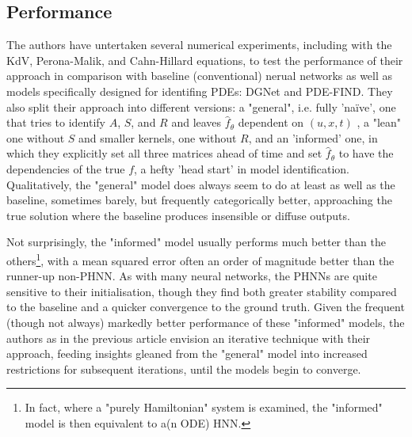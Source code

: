\documentclass[10 pt, a4paper]{article}
\begin{document}
\subsection{Performance}
The authors have untertaken several numerical experiments, including with the KdV, Perona-Malik, and Cahn-Hillard equations, to test the performance of their approach in comparison with baseline (conventional) nerual networks as well as models specifically designed for identifing PDEs: DGNet and PDE-FIND. They also split their approach into different versions: a "general", i.e. fully 'naïve', one that tries to identify $A$, $S$, and $R$ and leaves $\hat{f}_\theta$ dependent on $(u,x,t)$ , a "lean" one without $S$ and smaller kernels, one without $R$, and an 'informed' one, in which they explicitly set all three matrices ahead of time and set $\hat{f}_\theta$ to have the dependencies of the true $f$, a hefty 'head start' in model identification.\\
Qualitatively, the "general" model does always seem to do at least as well as the baseline, sometimes barely, but frequently categorically better, approaching the true solution where the baseline produces insensible or diffuse outputs. 
\begin{comment}
	Where they compare it to DGNet, the latter is more accurate, though the authors claim it "performs generally worse […] on varied test data" and is slower to train; PDE-FIND appears to do worse, but approach a qualitative resemblance to the true model, yet the authors simply state that it "is not able to find accurate models" in their experiments.
\end{comment}
Not surprisingly, the "informed" model usually performs much better than the others\footnote{In fact, where a "purely Hamiltonian" system is examined, the "informed" model is then equivalent to a(n ODE) HNN.}, with a mean squared error often an order of magnitude better than the runner-up non-PHNN. As with many neural networks, the PHNNs are quite sensitive to their initialisation, though they find both greater stability compared to the baseline and a quicker convergence to the ground truth. Given the frequent (though not always) markedly better performance of these "informed" models, the authors as in the previous article envision an iterative technique with their approach, feeding insights gleaned from the "general" model into increased restrictions for subsequent iterations, until the models begin to converge.
\end{document}
